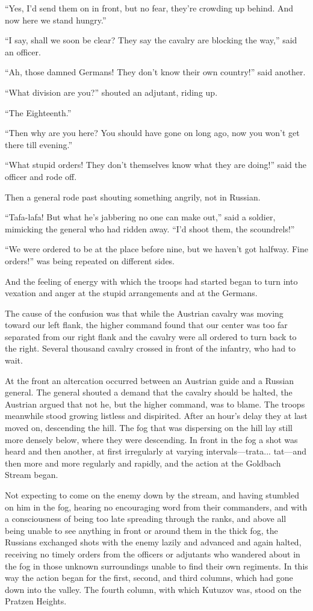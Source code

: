 ``Yes, I'd send them on in front, but no fear, they're crowding
up behind. And now here we stand hungry.''

``I say, shall we soon be clear? They say the cavalry are
blocking the way,'' said an officer.

``Ah, those damned Germans! They don't know their own country!''
said another.

``What division are you?'' shouted an adjutant, riding up.

``The Eighteenth.''

``Then why are you here? You should have gone on long ago, now
you won't get there till evening.''

``What stupid orders! They don't themselves know what they are
doing!''  said the officer and rode off.

Then a general rode past shouting something angrily, not in
Russian.

``Tafa-lafa! But what he's jabbering no one can make out,'' said
a soldier, mimicking the general who had ridden away. ``I'd shoot
them, the scoundrels!''

``We were ordered to be at the place before nine, but we haven't
got halfway. Fine orders!'' was being repeated on different
sides.

And the feeling of energy with which the troops had started began
to turn into vexation and anger at the stupid arrangements and at
the Germans.

The cause of the confusion was that while the Austrian cavalry
was moving toward our left flank, the higher command found that
our center was too far separated from our right flank and the
cavalry were all ordered to turn back to the right. Several
thousand cavalry crossed in front of the infantry, who had to
wait.

At the front an altercation occurred between an Austrian guide
and a Russian general. The general shouted a demand that the
cavalry should be halted, the Austrian argued that not he, but
the higher command, was to blame. The troops meanwhile stood
growing listless and dispirited. After an hour's delay they at
last moved on, descending the hill. The fog that was dispersing
on the hill lay still more densely below, where they were
descending. In front in the fog a shot was heard and then
another, at first irregularly at varying
intervals---trata... tat---and then more and more regularly and
rapidly, and the action at the Goldbach Stream began.

Not expecting to come on the enemy down by the stream, and having
stumbled on him in the fog, hearing no encouraging word from
their commanders, and with a consciousness of being too late
spreading through the ranks, and above all being unable to see
anything in front or around them in the thick fog, the Russians
exchanged shots with the enemy lazily and advanced and again
halted, receiving no timely orders from the officers or adjutants
who wandered about in the fog in those unknown surroundings
unable to find their own regiments. In this way the action began
for the first, second, and third columns, which had gone down
into the valley. The fourth column, with which Kutuzov was, stood
on the Pratzen Heights.

